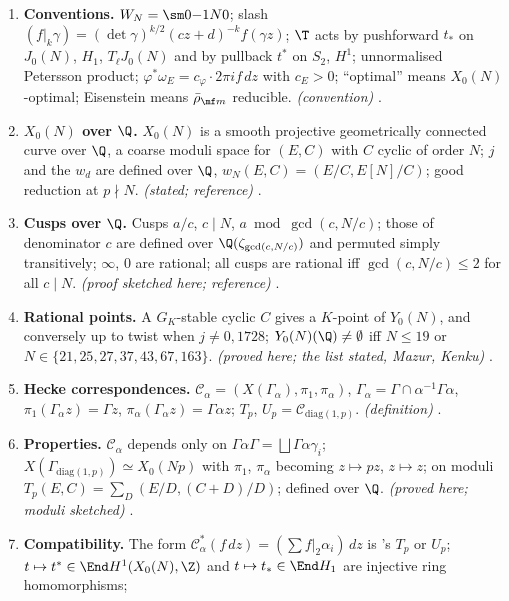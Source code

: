 \begin{enumerate}[label=\textbf{\thechapter.\arabic*}]
\item \textbf{Conventions.} $W_N=\sm0{-1}N0$; slash $(f|_k\gamma)=(\det\gamma)^{k/2}(cz+d)^{-k}f(\gamma z)$; $\T$ acts by pushforward $t_*$ on $J_0(N)$, $H_1$, $T_\ell J_0(N)$ and by pullback $t^*$ on $S_2$, $H^1$;
unnormalised Petersson product; $\varphi^*\omega_E=c_\varphi\cdot2\pi if\,dz$ with $c_E>0$; ``optimal'' means $X_0(N)$-optimal; Eisenstein means $\bar\rho_{\mf m}$ reducible. \emph{(convention)}
.
\item \textbf{$X_0(N)$ over $\Q$.} $X_0(N)$ is a smooth projective geometrically connected curve over $\Q$, a coarse moduli space for $(E,C)$ with $C$ cyclic of order $N$; $j$ and the $w_d$ are defined over $\Q$,
$w_N(E,C)=(E/C,E[N]/C)$; good reduction at $p\nmid N$. \emph{(stated; reference)} .
\item \textbf{Cusps over $\Q$.} Cusps $a/c$, $c\mid N$, $a\bmod\gcd(c,N/c)$; those of denominator $c$ are defined over $\Q(\zeta_{\gcd(c,N/c)})$ and permuted simply transitively; $\infty$, $0$ are rational; all cusps are
rational iff $\gcd(c,N/c)\le2$ for all $c\mid N$. \emph{(proof sketched here; reference)} .
\item \textbf{Rational points.} A $G_K$-stable cyclic $C$ gives a $K$-point of $Y_0(N)$, and conversely up to twist when $j\ne0,1728$; $Y_0(N)(\Q)\ne\emptyset$ iff $N\le19$ or $N\in\{21,25,27,37,43,67,163\}$.
\emph{(proved here; the list stated, Mazur, Kenku)} .
\item \textbf{Hecke correspondences.} $\mathcal C_\alpha=(X(\Gamma_\alpha),\pi_1,\pi_\alpha)$, $\Gamma_\alpha=\Gamma\cap\alpha^{-1}\Gamma\alpha$, $\pi_1(\Gamma_\alpha z)=\Gamma z$, $\pi_\alpha(\Gamma_\alpha z)=\Gamma\alpha z$; $T_p$, $U_p=\mathcal C_{\mathrm{diag}(1,p)}$.
\emph{(definition)} .
\item \textbf{Properties.} $\mathcal C_\alpha$ depends only on $\Gamma\alpha\Gamma=\bigsqcup\Gamma\alpha\gamma_i$; $X(\Gamma_{\mathrm{diag}(1,p)})\simeq X_0(Np)$ with $\pi_1$, $\pi_\alpha$ becoming $z\mapsto pz$, $z\mapsto z$; on moduli
$T_p(E,C)=\sum_D(E/D,(C+D)/D)$; defined over $\Q$. \emph{(proved here; moduli sketched)} .
\item \textbf{Compatibility.} The form $\mathcal C_\alpha^*(f\,dz)=(\sum f|_2\alpha_i)\,dz$ is 's $T_p$ or $U_p$; $t\mapsto t^*\in\End H^1(X_0(N),\Z)$ and $t\mapsto t_*\in\End H_1$ are injective ring homomorphisms;

\end{enumerate}
